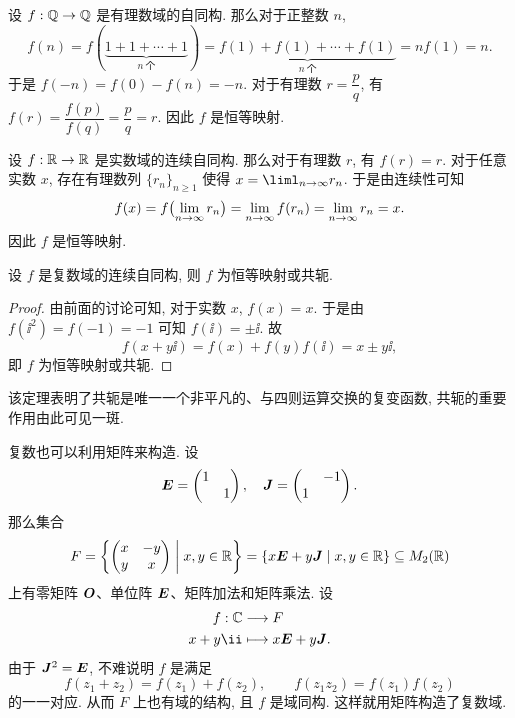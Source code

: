 \begin{exampleenum}
  \item 设 $f:{\mathbb{Q}}\rightarrow{\mathbb{Q}}$ 是有理数域的自同构. 那么对于正整数 $n$,
  \[
      f(n)
    =f(\underbrace{1+1+\cdots+1}_{n\ \text{个}})
    =\underbrace{f(1)+f(1)+\cdots+f(1)}_{n\ \text{个}}
    =nf(1)=n.
  \]
  于是 $f(-n)=f(0)-f(n)=-n$.
  对于有理数 $r=\dfrac pq$, 有 $f(r)=\dfrac{f(p)}{f(q)}=\dfrac pq=r$.
  因此 $f$ 是恒等映射.
  \item 设 $f:{\mathbb{R}}\rightarrow{\mathbb{R}}$ 是实数域的连续自同构. 那么对于有理数 $r$, 有 $f(r)=r$.
  对于任意实数 $x$, 存在有理数列 $\{r_n\}_{n\ge 1}$ 使得 $x=\liml_{n\ra\infty} r_n$.
  于是由连续性可知
  \[
      f(x)
    =f\bigl(\lim_{n\rightarrow\infty} r_n\bigr)
    =\lim_{n\rightarrow\infty} f(r_n)
    =\lim_{n\rightarrow\infty} r_n
    =x.
  \]
  因此 $f$ 是恒等映射.
\end{exampleenum}

\begin{theorem}
  设 $f$ 是复数域的连续自同构, 则 $f$ 为恒等映射或共轭.
\end{theorem}

\begin{proof}
  由前面的讨论可知, 对于实数 $x$, $f(x)=x$.
  于是由 $f(\ii^2)=f(-1)=-1$ 可知 $f(\ii)=\pm\ii$.
  故
  \[
    f(x+y\ii)=f(x)+f(y)f(\ii)=x\pm y\ii,
  \]
  即 $f$ 为恒等映射或共轭.
\end{proof}

该定理表明了共轭是唯一一个非平凡的、与四则运算交换的复变函数, 共轭的重要作用由此可见一斑.

复数也可以利用矩阵来构造.
设
\[
  {\boldsymbol{E}}=\begin{pmatrix}1& \\&1\end{pmatrix},\quad
  {\boldsymbol{J}}=\begin{pmatrix}&-1\\1&\end{pmatrix}.
\]
那么集合
\[
  F={\left\{\begin{pmatrix}
    x&-y\\y&x
  \end{pmatrix}\mathrel{\bigg|}x,y\in{\mathbb{R}}\right\}}
  ={\left\{x{\boldsymbol{E}}+y{\boldsymbol{J}}\mid x,y\in{\mathbb{R}}\right\}}\subseteq M_2({\mathbb{R}})
\]
上有零矩阵 ${\boldsymbol{O}}$、单位阵 ${\boldsymbol{E}}$、矩阵加法和矩阵乘法.
设
\begin{align*}
  f:\BC&\lra F\\
  x+y\ii&\lto x\bfE+y\bfJ.
\end{align*}
由于 ${\boldsymbol{J}}^2={\boldsymbol{E}}$, 不难说明 $f$ 是满足
\[
  f(z_1+z_2)=f(z_1)+f(z_2),\qquad
  f(z_1z_2)=f(z_1)f(z_2)
\]
的一一对应.
从而 $F$ 上也有域的结构, 且 $f$ 是域同构.
这样就用矩阵构造了复数域.

